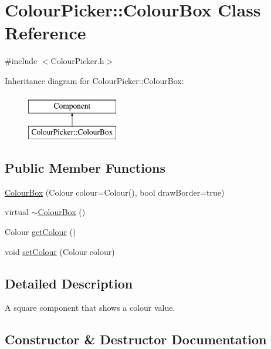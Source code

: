 \hypertarget{classColourPicker_1_1ColourBox}{}\section{Colour\+Picker\+:\+:Colour\+Box Class Reference}
\label{classColourPicker_1_1ColourBox}


{\ttfamily \#include $<$Colour\+Picker.\+h$>$}

Inheritance diagram for Colour\+Picker\+:\+:Colour\+Box\+:\begin{figure}[H]
\begin{center}
\leavevmode
\includegraphics[height=2.000000cm]{classColourPicker_1_1ColourBox}
\end{center}
\end{figure}
\subsection*{Public Member Functions}
\begin{DoxyCompactItemize}
\item 
\mbox{\hyperlink{classColourPicker_1_1ColourBox_a56eb7c1a11d595fbc1fedec31d782297}{Colour\+Box}} (Colour colour=Colour(), bool draw\+Border=true)
\item 
virtual \mbox{\hyperlink{classColourPicker_1_1ColourBox_ad89d6748cd5e8fe912ae56289c6d86ca}{$\sim$\+Colour\+Box}} ()
\item 
Colour \mbox{\hyperlink{classColourPicker_1_1ColourBox_a15bd1c09cc1481d35ab7f27022a7cb12}{get\+Colour}} ()
\item 
void \mbox{\hyperlink{classColourPicker_1_1ColourBox_a9d3cdd11b9949c6e23d429fd5288110a}{set\+Colour}} (Colour colour)
\end{DoxyCompactItemize}


\subsection{Detailed Description}
A square component that shows a colour value. 

\subsection{Constructor \& Destructor Documentation}
\mbox{\label{classColourPicker_1_1ColourBox_a56eb7c1a11d595fbc1fedec31d782297}} 
